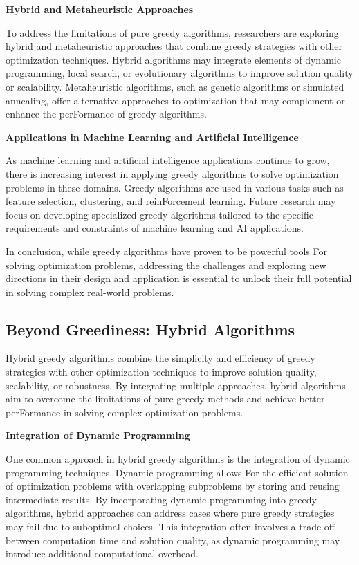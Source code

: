 \documentclass[12pt]{book} %
\begin{document}
\textbf{Hybrid and Metaheuristic Approaches}

To address the limitations of pure greedy algorithms, researchers are exploring hybrid and metaheuristic approaches that combine greedy strategies with other optimization techniques. Hybrid algorithms may integrate elements of dynamic programming, local search, or evolutionary algorithms to improve solution quality or scalability. Metaheuristic algorithms, such as genetic algorithms or simulated annealing, offer alternative approaches to optimization that may complement or enhance the perFormance of greedy algorithms.

\textbf{Applications in Machine Learning and Artificial Intelligence}

As machine learning and artificial intelligence applications continue to grow, there is increasing interest in applying greedy algorithms to solve optimization problems in these domains. Greedy algorithms are used in various tasks such as feature selection, clustering, and reinForcement learning. Future research may focus on developing specialized greedy algorithms tailored to the specific requirements and constraints of machine learning and AI applications.

In conclusion, while greedy algorithms have proven to be powerful tools For solving optimization problems, addressing the challenges and exploring new directions in their design and application is essential to unlock their full potential in solving complex real-world problems.

\subsection{Beyond Greediness: Hybrid Algorithms}

Hybrid greedy algorithms combine the simplicity and efficiency of greedy strategies with other optimization techniques to improve solution quality, scalability, or robustness. By integrating multiple approaches, hybrid algorithms aim to overcome the limitations of pure greedy methods and achieve better perFormance in solving complex optimization problems.

\textbf{Integration of Dynamic Programming}

One common approach in hybrid greedy algorithms is the integration of dynamic programming techniques. Dynamic programming allows For the efficient solution of optimization problems with overlapping subproblems by storing and reusing intermediate results. By incorporating dynamic programming into greedy algorithms, hybrid approaches can address cases where pure greedy strategies may fail due to suboptimal choices. This integration often involves a trade-off between computation time and solution quality, as dynamic programming may introduce additional computational overhead.
\end{document}
